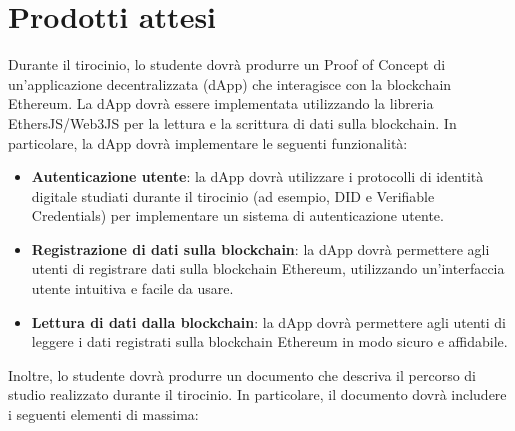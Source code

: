\section*{Prodotti attesi}
Durante il tirocinio, lo studente dovrà produrre un Proof of Concept di un'applicazione decentralizzata (dApp) che interagisce con la blockchain Ethereum. La dApp dovrà essere implementata utilizzando la libreria EthersJS/Web3JS per la lettura e la scrittura di dati sulla blockchain. In particolare, la dApp dovrà implementare le seguenti funzionalità:

\begin{itemize}
    \item \textbf{Autenticazione utente}: la dApp dovrà utilizzare i protocolli di identità digitale studiati durante il tirocinio (ad esempio, DID e Verifiable Credentials) per implementare un sistema di autenticazione utente.
    \item \textbf{Registrazione di dati sulla blockchain}: la dApp dovrà permettere agli utenti di registrare dati sulla blockchain Ethereum, utilizzando un'interfaccia utente intuitiva e facile da usare.
    \item \textbf{Lettura di dati dalla blockchain}: la dApp dovrà permettere agli utenti di leggere i dati registrati sulla blockchain Ethereum in modo sicuro e affidabile.
\end{itemize}

\newpage

Inoltre, lo studente dovrà produrre un documento che descriva il percorso di studio realizzato durante il tirocinio. 
In particolare, il documento dovrà includere i seguenti elementi di massima:

